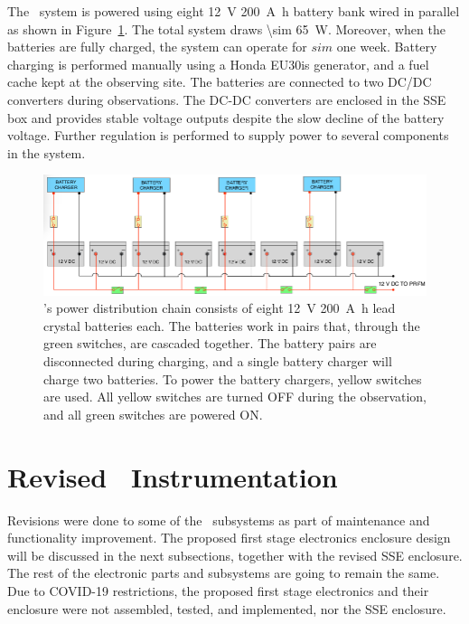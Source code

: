 The \prizm\ system is powered using eight \SI{12}{\volt} \SI{200}{\ampere \hour} battery bank wired in parallel as shown in Figure~\ref{Fig:power}. The total system draws \SI{\sim 65}{\watt}.
Moreover, when the batteries are fully charged, the system can operate for $sim$ one week. Battery charging is performed manually using a Honda EU30is generator, and a fuel cache kept at the observing site. The batteries are connected to two DC/DC converters during observations. The DC-DC converters are enclosed in the SSE box and provides stable voltage outputs despite the slow decline of the battery voltage. Further regulation is performed to supply power to several components in the system.

\begin{figure}
	\centering
	\includegraphics[width=\linewidth]{Figures/power}
	\caption{\prizm's power distribution chain consists of eight \SI{12}{\volt} \SI{200}{\ampere \hour} lead crystal batteries each. The batteries work in pairs that, through the green switches, are cascaded together. The battery pairs are disconnected during charging, and a single battery charger will charge two batteries. To power the battery chargers, yellow switches are used. All yellow switches are turned OFF during the observation, and all green switches are powered ON.}
	\label{Fig:power}
\end{figure}

\section{Revised \prizm~Instrumentation}

Revisions were done to some of the \prizm\ subsystems as part of maintenance and functionality improvement. The proposed first stage electronics enclosure design will be discussed in the next subsections, together with the revised SSE enclosure. The rest of the electronic parts and subsystems are going to remain the same. Due to COVID-19 restrictions, the proposed first stage electronics and their enclosure were not assembled, tested, and implemented, nor the SSE enclosure. 

